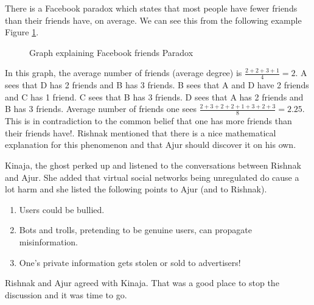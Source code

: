  There is a Facebook paradox which states that most people have fewer friends than their friends have, on average. We can see this from the following example Figure \ref{21g1}.
 \begin{figure}
\begin{center}
\caption{ Graph explaining Facebook friends Paradox}\label{21g1}
\end{center}
\end{figure}

In this graph, the average number of friends (average degree) is $\frac{2+2+3+1}{4}=2$.  A sees that D has 2 friends and B has 3 friends. B sees that A and D have 2 friends and C has 1 friend. C sees that B has 3 friends. D sees that A has 2 friends and B has 3 friends. Average number of friends one sees 
$\frac{2+3+2+2+1+3+2+3}{8}=2.25$. This is in contradiction to the common belief that one has more friends than their friends have!. Rishnak mentioned that there is a nice mathematical explanation for this phenomenon and that Ajur should discover it on his own.

Kinaja, the ghost perked up and listened to the conversations between Rishnak and Ajur. She added that virtual social networks being unregulated do cause a lot harm and she listed the following points to Ajur (and to Rishnak).
\begin{enumerate}
    \item Users could be bullied.
    \item  Bots and trolls, pretending to be genuine users,  can propagate misinformation.
    \item  One's private information gets stolen or sold to advertisers!
\end{enumerate}

Rishnak and Ajur agreed with Kinaja. That was a good place to stop the discussion and it was time to go.
